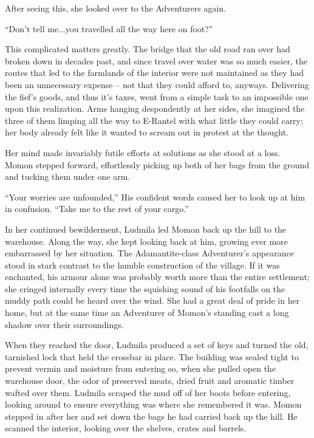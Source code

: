  

After seeing this, she looked over to the Adventurers again.

 

“Don’t tell me...you travelled all the way here on foot?”

 

This complicated matters greatly. The bridge that the old road ran over had broken down in decades past, and since travel over water was so much easier, the routes that led to the farmlands of the interior were not maintained as they had been an unnecessary expense – not that they could afford to, anyways. Delivering the fief’s goods, and thus it’s taxes, went from a simple task to an impossible one upon this realization. Arms hanging despondently at her sides, she imagined the three of them limping all the way to E-Rantel with what little they could carry; her body already felt like it wanted to scream out in protest at the thought.

 

Her mind made invariably futile efforts at solutions as she stood at a loss. Momon stepped forward, effortlessly picking up both of her bags from the ground and tucking them under one arm.

 

“Your worries are unfounded,” His confident words caused her to look up at him in confusion. “Take me to the rest of your cargo.”

 

In her continued bewilderment, Ludmila led Momon back up the hill to the warehouse. Along the way, she kept looking back at him, growing ever more embarrassed by her situation. The Adamantite-class Adventurer’s appearance stood in stark contrast to the humble construction of the village. If it was enchanted, his armour alone was probably worth more than the entire settlement; she cringed internally every time the squishing sound of his footfalls on the muddy path could be heard over the wind. She had a great deal of pride in her home, but at the same time an Adventurer of Momon’s standing cast a long shadow over their surroundings.

 

When they reached the door, Ludmila produced a set of keys and turned the old, tarnished lock that held the crossbar in place. The building was sealed tight to prevent vermin and moisture from entering so, when she pulled open the warehouse door, the odor of preserved meats, dried fruit and aromatic timber wafted over them. Ludmila scraped the mud off of her boots before entering, looking around to ensure everything was where she remembered it was. Momon stepped in after her and set down the bags he had carried back up the hill. He scanned the interior, looking over the shelves, crates and barrels.

